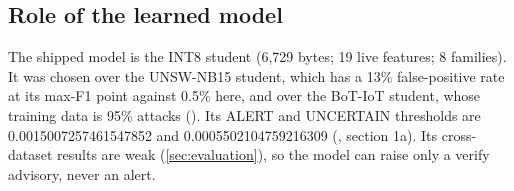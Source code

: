 \subsection{Role of the learned model}

The shipped model is the INT8 student \allowbreak{} (6,729 bytes; 19 live features; 8 families). It was chosen over the UNSW-NB15 student, which has a 13\% false-positive rate at its max-F1 point against 0.5\% here, and over the BoT-IoT student, whose training data is 95\% attacks (). Its ALERT and UNCERTAIN thresholds are 0.0015007257461547852 and 0.0005502104759216309 (, section 1a). Its cross-dataset results are weak (\cref{sec:evaluation}), so the model can raise only a verify advisory, never an alert.
